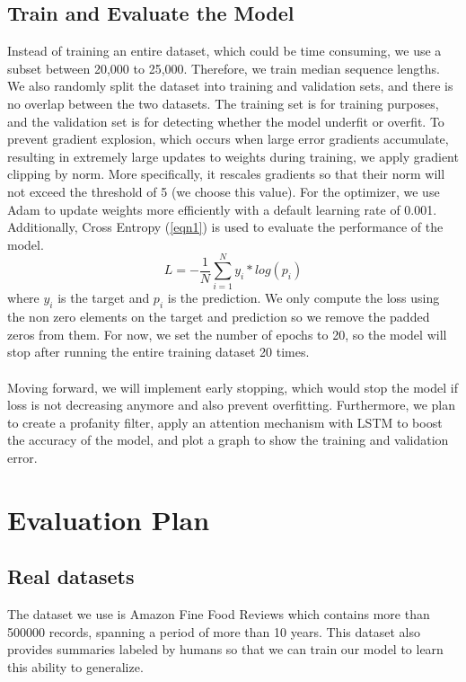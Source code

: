 \documentclass[conference]{IEEEtran}
\begin{document}
\subsection{Train and Evaluate the Model}
Instead of training an entire dataset, which could be time consuming, we use a subset between 20,000 to 25,000. Therefore, we train median sequence lengths. We also randomly split the dataset into training and validation sets, and there is no overlap between the two datasets. The training set is for training purposes, and the validation set is for detecting whether the model underfit or overfit. To prevent gradient explosion, which occurs when large error gradients accumulate, resulting in extremely large updates to weights during training, we apply gradient clipping by norm. More specifically, it rescales gradients so that their norm will not exceed the threshold of 5 (we choose this value). For the optimizer, we use Adam to update weights more efficiently with a default learning rate of 0.001. Additionally, Cross Entropy (\ref{eqn1}) is used to evaluate the performance of the model. 
\begin{equation}
    \label{eqn1}
    L = - \dfrac{1}{N} \sum_{i = 1}^{N} y_i * log(p_i)
\end{equation}    
where $y_i$ is the target and $p_i$ is the prediction. We only compute the loss using the non zero elements on the target and prediction so we remove the padded zeros from them. 
For now, we set the number of epochs to 20, so the model will stop after running the entire training dataset 20 times.  \\ \\ 
\indent Moving forward, we will implement early stopping, which would stop the model if loss is not decreasing anymore and also prevent overfitting. Furthermore, we plan to create a profanity filter, apply an attention mechanism with LSTM to boost the accuracy of the model, and plot a graph to show the training and validation error.


\section{Evaluation Plan}
\subsection{Real datasets}
The dataset we use is Amazon Fine Food Reviews which contains more than 500000 records, spanning a period of more than 10 years. This dataset also provides summaries labeled by humans so that we can train our model to learn this ability to generalize. 
\end{document}

